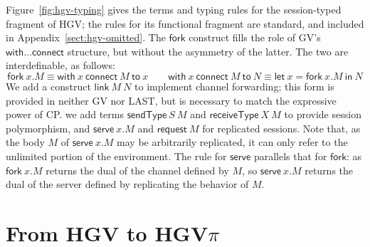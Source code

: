 \documentclass{easychair}
\makeatletter
\newcommand{\ba}{\begin{array}}
\newcommand{\ea}{\end{array}}
\newcommand{\bl}{\ba{@{}c@{}}}
\newcommand{\el}{\ea}
\newcommand{\key}{\mathsf}
\newcommand{\gvEndOutput}{\key{end}_!}
\newcommand{\gvServer}[1]{\flat {#1}}
\newcommand{\gvj}[3]{{#1} \vdash {#2} : {#3}}
\newcommand{\gvLink}[2]{\key{link}~{#1}~{#2}}
\newcommand{\gvLet}[3]{\key{let}~{#1}={#2}~\key{in}~{#3}}
\newcommand{\gvFork}[2]{\key{fork}~{#1}.{#2}}
\newcommand{\gvWith}[3]{\key{with}~{#1}~\key{connect}~{#2}~\key{to}~{#3}}
\newcommand{\gvSendType}[2]{\key{sendType}~{#1}~{#2}}
\newcommand{\gvReceiveType}[2]{\key{receiveType}~{#1}~{#2}}
\newcommand{\gvServeOld}[3]{\key{defServer}~{#1}({#2})={#3}}
\newcommand{\gvServe}[2]{\key{serve}~{#1}.{#2}}
\newcommand{\gvRequest}[1]{\key{request}~{#1}}
\newcommand{\un}[1]{\mathit{un}(#1)}
\newcommand{\last}{LAST\xspace}
\newcommand{\hgv}{HGV\xspace}
\newcommand{\hgvpi}{HGV$\pi$\xspace}
\newcommand{\infr}[3][]{\inferrule{#2}{#3}} %
\newcommand{\todo}[1]{\textbf{\color{red}TODO: #1}}
\makeatother
\begin{document}
Figure~\ref{fig:hgv-typing} gives the terms and typing rules for the session-typed fragment of \hgv;
the rules for its functional fragment are standard, and included in Appendix~\ref{sect:hgv-omitted}.
The $\key{fork}$ construct fills the role of GV's $\key{with}\dots\key{connect}$ structure, but
without the asymmetry of the latter.  The two are interdefinable, as follows:
\[
\gvFork{x}{M} \equiv \gvWith{x}{M}{x} \qquad \gvWith{x}{M}{N} \equiv \gvLet{x}{\gvFork{x}{M}}{N}
\]
We add a construct $\gvLink{M}{N}$ to implement channel forwarding; this form is provided in neither
GV nor \last, but is necessary to match the expressive power of CP. we add terms $\gvSendType{S}{M}$
and $\gvReceiveType{X}{M}$ to provide session polymorphism, and $\gvServe{x}{M}$ and $\gvRequest{M}$
for replicated sessions. Note that, as the body $M$ of $\gvServe{x}{M}$ may be arbitrarily
replicated, it can only refer to the unlimited portion of the environment.
%
The rule for $\key{serve}$ parallels that for $\key{fork}$: as $\gvFork{x}{M}$ returns the dual of
the channel defined by $M$, so $\gvServe{x}{M}$ returns the dual of the server defined by
replicating the behavior of $M$.





\section{From \hgv to \hgvpi}
\end{document}
